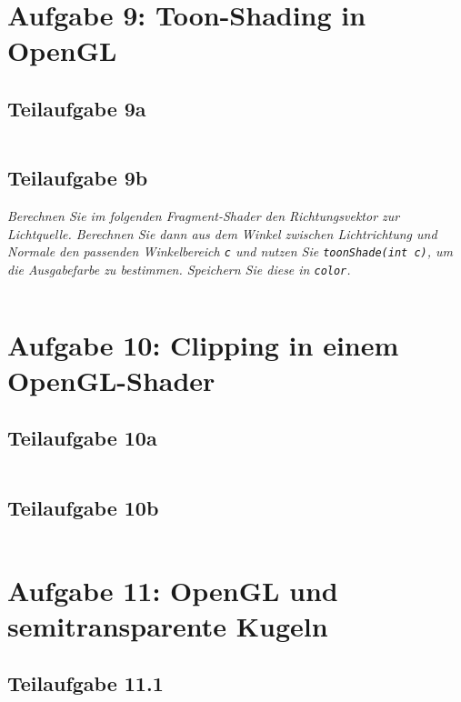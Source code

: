 \documentclass[a4paper]{scrartcl}
\begin{document}
\clearpage
\section*{Aufgabe 9: Toon-Shading in OpenGL}
\subsection*{Teilaufgabe 9a}
\inputminted[linenos, numbersep=5pt, tabsize=4, frame=lines, label=shader9a.vert]{glsl}{shader9a.vert}

\subsection*{Teilaufgabe 9b}
\textit{Berechnen Sie im folgenden Fragment-Shader den Richtungsvektor zur Lichtquelle.
Berechnen Sie dann aus dem Winkel zwischen Lichtrichtung und Normale den passenden Winkelbereich \texttt{c} und nutzen Sie \texttt{toonShade(int c)}, um die Ausgabefarbe zu
bestimmen. Speichern Sie diese in \texttt{color}.}
\inputminted[linenos, numbersep=5pt, tabsize=4, frame=lines, label=shader9b.frag]{glsl}{shader9b.frag}

\clearpage
\section*{Aufgabe 10: Clipping in einem OpenGL-Shader}
\subsection*{Teilaufgabe 10a}
\inputminted[linenos, numbersep=5pt, tabsize=4, frame=lines, label=shader10a.vert]{glsl}{shader10a.vert}

\subsection*{Teilaufgabe 10b}
\inputminted[linenos, numbersep=5pt, tabsize=4, frame=lines, label=shader10b.frag]{glsl}{shader10b.frag}

\clearpage
\section*{Aufgabe 11: OpenGL und semitransparente Kugeln}
\subsection*{Teilaufgabe 11.1}
\inputminted[linenos, numbersep=5pt, tabsize=4, frame=lines, label=opengl.cpp]{cpp}{opengl.cpp}
\end{document}
